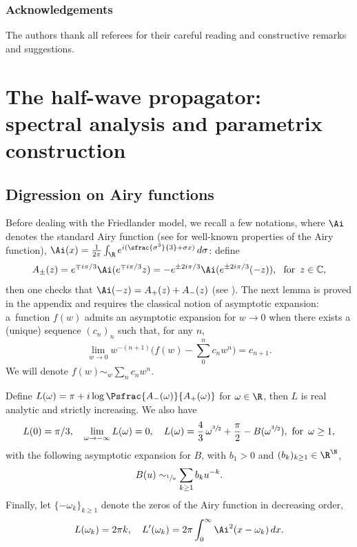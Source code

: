 \subsubsection*{Acknowledgements}
The authors thank all referees for their careful reading and constructive remarks and suggestions.

\section{The half-wave propagator:\texorpdfstring{\\}{cr} spectral analysis and parametrix construction}

\subsection{Digression on Airy functions}
Before dealing with the Friedlander model, we recall a few notations, where $\Ai$ denotes the standard Airy function (see \eg \cite{AFbook} for well-known properties of the Airy function), $ \Ai(x)=\frac 1 {2\pi } \int_{\R} e^{ i (\sfrac{\sigma^{3}}{3}+\sigma x)} \,d\sigma$: define
\begin{equation}
\label{eq:Apm}
A_\pm(z)=e^{\mp i\pi/3} \Ai(e^{\mp i\pi/3} z)=-e^{\pm 2i\pi/3} \Ai(e^{\pm 2i\pi/3} (-z)),\,\,\text{ for } \,
z\in \mathbb{C},
\end{equation}
then one checks that $\Ai(-z)=A_+(z)+A_-(z)$ (see \cite[(2.3)]{AFbook}). The next lemma is proved in the appendix and requires the classical notion of asymptotic expansion: a~function $f(w)$ admits an asymptotic expansion for $w\to 0$ when there exists a (unique) sequence $(c_{n})_{n}$ such that, for any $n$,
\[
\lim_{w\to 0} w^{-(n+1)}\biggl(f(w)-\sum_{0}^{n} c_{n} w^{n}\biggr)=c_{n+1}.
\]
We will denote $ f(w)\sim_{w} \sum_{n} c_{n} w^{n}$.
\begin{lemma}
\label{lemL}
Define
$L(\omega)=\pi+i\log \Psfrac{A_-(\omega)}{A_+(\omega)}$ for $\omega \in \R$,
then $L$ is real analytic and strictly increasing. We also
have
\begin{equation}
\label{eq:propL}
L(0)=\pi/3,\quad\lim_{\omega\to -\infty} L(\omega)=0,\quad
L(\omega)=\frac 4 3\, \omega^{\sfrac 3 2}+\frac{\pi}{2}-B(\omega^{\sfrac 3 2}),\,\,\text{for } \,\omega\geq 1,
\end{equation}
with the following asymptotic expansion for $B$, with $b_{1}>0$ and $(b_{k})_{k\geq 1}\in \R^{\N}$,
\begin{equation}
\label{eq:B}
B(u)\sim_{\sfrac 1u } \sum_{k\geq 1} b_k u^{-k}.
\end{equation}
Finally, let $\{-\omega_k\}_{k\geq 1}$ denote the zeros of the Airy function in decreasing order,
\begin{equation}
\label{eq:propL2}
L(\omega_k)=2\pi k,\quad L'(\omega_k)=2\pi \int_0^\infty \Ai^2(x-\omega_k) \,dx.
\end{equation}
\end{lemma}

